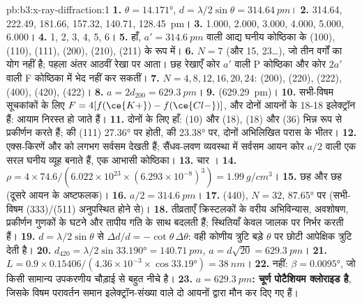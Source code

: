 \begin{solution}{pb:b3:x-ray-diffraction:1}
\textbf{1.} $\theta = \ang{14.171}$, $d = \lambda/2\sin\theta = \qty{314.64}{pm}$।
\textbf{2.} 314.64, 222.49, 181.66, 157.32, 140.71, \qty{128.45}{pm}।
\textbf{3.} 1.000, 2.000, 3.000, 4.000, 5.000, 6.000।
\textbf{4.} 1, 2, 3, 4, 5, 6।
\textbf{5.} हाँ, $a' = \qty{314.6}{pm}$ वाली आद्य घनीय कोष्ठिका के (100), (110), (111), (200), (210), (211)
के रूप में।
\textbf{6.} $N = 7$ (और 15, 23\dots), जो तीन वर्गों का योग नहीं है; पहला
अंतर आठवीं रेखा पर आता। छह रेखाएँ कोर $a'$ वाली P
कोष्ठिका और कोर $2a'$ वाली F कोष्ठिका में भेद नहीं कर सकतीं।
\textbf{7.} $N = 4, 8, 12, 16, 20, 24$: (200), (220), (222), (400), (420), (422)।
\textbf{8.} $a = 2d_{200} = \qty{629.3}{pm}$।
\textbf{9.}  (\qty{629.29}{pm})।
\textbf{10.} सभी-विषम सूचकांकों के लिए $F = 4[f(\ce{K+}) - f(\ce{Cl-})]$, और दोनों आयनों के
18-18 इलेक्ट्रॉन हैं: आयाम निरस्त हो जाते हैं।
\textbf{11.} दोनों के लिए हाँ:  (10) और  (18),  (18) और  (36)
भिन्न रूप से प्रकीर्णन करते हैं;  की (111) \ang{27.36} पर होती,  की \ang{23.38} पर,
दोनों अभिलिखित परास के भीतर।
\textbf{12.} एक्स-किरणें  और  को लगभग सर्वसम देखती हैं; सैंधव-लवण व्यवस्था में
सर्वसम आयन कोर $a/2$ वाली एक सरल घनीय व्यूह बनाते हैं, एक आभासी कोष्ठिका।
\textbf{13.} चार ।
\textbf{14.} $\rho = 4 \times 74.6/(6.022\times10^{23} \times (6.293\times10^{-8})^3) =
\qty{1.99}{g/cm^3}$।
\textbf{15.} छह और छह (दूसरे आयन के अष्टफलक)।
\textbf{16.} $a/2 = \qty{314.6}{pm}$।
\textbf{17.} (440), $N = 32$, \ang{87.65} पर (सभी-विषम (333)/(511) अनुपस्थित होने से)।
\textbf{18.} तीव्रताएँ क्रिस्टलकों के वरीय अभिविन्यास,
अवशोषण, प्रकीर्णन गुणकों के घटने और तापीय गति के साथ बदलती हैं; स्थितियाँ
केवल जालक पर निर्भर करती हैं।
\textbf{19.} $d = \lambda/2\sin\theta$ से $\Delta d/d = -\cot\theta\,\Delta\theta$: वही कोणीय त्रुटि
बड़े $\theta$ पर छोटी आपेक्षिक त्रुटि देती है।
\textbf{20.} $d_{420} = \lambda/2\sin\ang{33.190} = \qty{140.71}{pm}$, $a = d\sqrt{20} =
\qty{629.3}{pm}$।
\textbf{21.} $L = 0.9 \times 0.15406/(4.36\times10^{-3} \times \cos\ang{33.19}) = \qty{38}{nm}$।
\textbf{22.} नहीं: $\beta = \ang{0.0095}$, जो किसी सामान्य उपकरणीय चौड़ाई से बहुत नीचे है।
\textbf{23.} \textbf{$a = \qty{629.3}{pm}$: चूर्ण पोटैशियम क्लोराइड है}, जिसके विषम
परावर्तन समान इलेक्ट्रॉन-संख्या वाले दो आयनों द्वारा मौन कर दिए गए हैं।
\end{solution}

